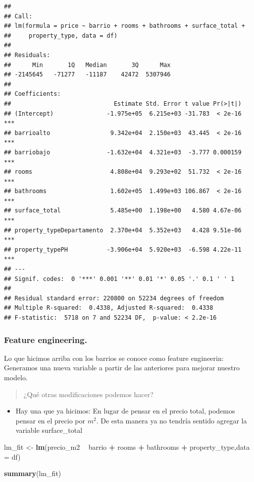 \documentclass[]{book}
\newenvironment{Shaded}{\begin{snugshade}}{\end{snugshade}}
\newcommand{\DataTypeTok}[1]{\textcolor[rgb]{0.13,0.29,0.53}{#1}}
\newcommand{\KeywordTok}[1]{\textcolor[rgb]{0.13,0.29,0.53}{\textbf{#1}}}
\newcommand{\NormalTok}[1]{#1}
\newcommand{\OperatorTok}[1]{\textcolor[rgb]{0.81,0.36,0.00}{\textbf{#1}}}
\newcommand{\StringTok}[1]{\textcolor[rgb]{0.31,0.60,0.02}{#1}}
\providecommand{\tightlist}{%
  \setlength{\itemsep}{0pt}\setlength{\parskip}{0pt}}
\begin{document}
\begin{verbatim}
## 
## Call:
## lm(formula = price ~ barrio + rooms + bathrooms + surface_total + 
##     property_type, data = df)
## 
## Residuals:
##      Min       1Q   Median       3Q      Max 
## -2145645   -71277   -11187    42472  5307946 
## 
## Coefficients:
##                             Estimate Std. Error t value Pr(>|t|)    
## (Intercept)               -1.975e+05  6.215e+03 -31.783  < 2e-16 ***
## barrioalto                 9.342e+04  2.150e+03  43.445  < 2e-16 ***
## barriobajo                -1.632e+04  4.321e+03  -3.777 0.000159 ***
## rooms                      4.808e+04  9.293e+02  51.732  < 2e-16 ***
## bathrooms                  1.602e+05  1.499e+03 106.867  < 2e-16 ***
## surface_total              5.485e+00  1.198e+00   4.580 4.67e-06 ***
## property_typeDepartamento  2.370e+04  5.352e+03   4.428 9.51e-06 ***
## property_typePH           -3.906e+04  5.920e+03  -6.598 4.22e-11 ***
## ---
## Signif. codes:  0 '***' 0.001 '**' 0.01 '*' 0.05 '.' 0.1 ' ' 1
## 
## Residual standard error: 220800 on 52234 degrees of freedom
## Multiple R-squared:  0.4338, Adjusted R-squared:  0.4338 
## F-statistic:  5718 on 7 and 52234 DF,  p-value: < 2.2e-16
\end{verbatim}

\hypertarget{feature-engineering.}{%
\subsubsection{Feature engineering.}\label{feature-engineering.}}

Lo que hicimos arriba con los barrios se conoce como feature engineerin: Generamos una nueva variable a partir de las anteriores para mejorar nuestro modelo.

\begin{quote}
¿Qué otras modificaciones podemos hacer?
\end{quote}

\begin{itemize}
\tightlist
\item
  Hay una que ya hicimos: En lugar de pensar en el precio total, podemos pensar en el precio por \(m^2\). De esta manera ya no tendría sentido agregar la variable surface\_total
\end{itemize}

\begin{Shaded}
\begin{Highlighting}[]
\NormalTok{lm_fit <-}\StringTok{ }\KeywordTok{lm}\NormalTok{(precio_m2 }\OperatorTok{~}\StringTok{ }\NormalTok{barrio  }\OperatorTok{+}\StringTok{ }\NormalTok{rooms }\OperatorTok{+}\StringTok{ }\NormalTok{bathrooms }\OperatorTok{+}\StringTok{ }\NormalTok{property_type,}\DataTypeTok{data =}\NormalTok{ df)}

\KeywordTok{summary}\NormalTok{(lm_fit)}
\end{Highlighting}
\end{Shaded}
\end{document}

